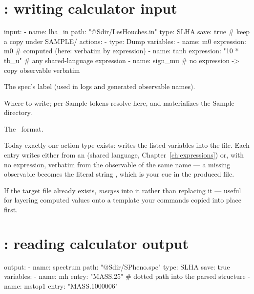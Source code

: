 \section{: writing calculator input}
\label{sec:input-spec}

\begin{yamlwin}
input:
  - name: lha_in
    path: "@Sdir/LesHouches.in"
    type: SLHA
    save: true                    # keep a copy under SAMPLE/
    actions:
      - type: Dump
        variables:
          - name: m0
            expression: m0            # computed (here: verbatim by expression)
          - name: tanb
            expression: "10 * tb_u"   # any shared-language expression
          - name: sign_mu             # no expression -> copy observable verbatim
\end{yamlwin}

\begin{keylist}
  \item[name] The spec's label (used in logs and generated observable names).
  \item[path] Where to write; per-Sample tokens resolve here, and 
        materializes the Sample directory.
  \item[type] The \Portal\ format.
  \item[actions] Today exactly one action type exists:  writes the listed
        variables into the file. Each entry writes  either from an
         (shared language, Chapter~\ref{ch:expressions}) or, with no
        expression, verbatim from the observable of the same name --- a missing
        observable becomes the literal string , which is your cue
        in the produced file.
\end{keylist}

If the target file already exists,  \emph{merges} into it rather than
replacing it --- useful for layering computed values onto a template your commands
copied into place first.

\section{: reading calculator output}
\label{sec:output-spec}

\begin{yamlwin}
output:
  - name: spectrum
    path: "@Sdir/SPheno.spc"
    type: SLHA
    save: true
    variables:
      - name: mh
        entry: "MASS.25"          # dotted path into the parsed structure
      - name: mstop1
        entry: "MASS.1000006"
\end{yamlwin}

